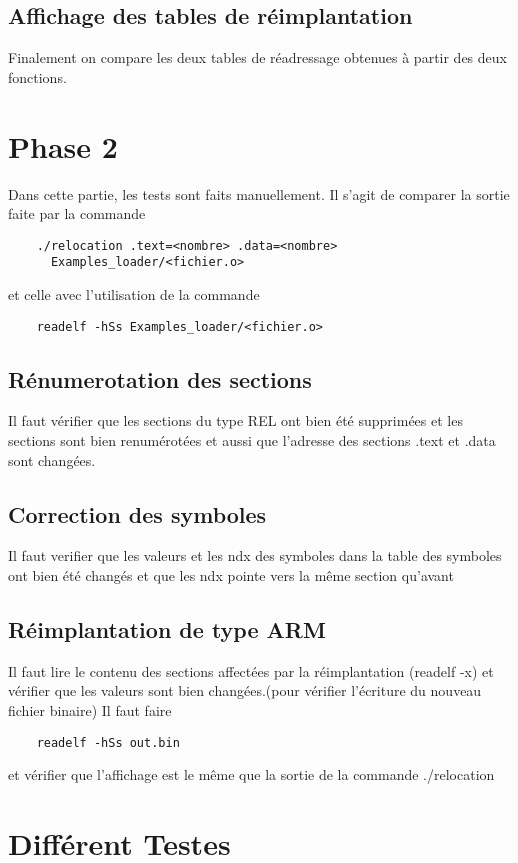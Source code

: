 \documentclass[a4paper]{article} %
\begin{document}
\subsection{Affichage des tables de réimplantation}
Finalement on compare les deux tables de réadressage obtenues à partir des 
deux fonctions.
\section{Phase 2}
Dans cette partie, les tests sont faits manuellement. Il s’agit de comparer 
la sortie faite par la commande 

\begin{lstlisting}
    ./relocation .text=<nombre> .data=<nombre> 
      Examples_loader/<fichier.o>
\end{lstlisting}
et celle avec l’utilisation de la commande 
\begin{lstlisting}
    readelf -hSs Examples_loader/<fichier.o>
\end{lstlisting}


\subsection{Rénumerotation des sections}
Il faut vérifier que les sections du type REL ont bien été supprimées et les 
sections sont bien renumérotées et aussi que l’adresse des sections .text et 
.data sont changées.

\subsection{Correction des symboles}
Il faut verifier que les valeurs et les ndx des symboles dans la table des symboles 
ont bien été changés et que les ndx pointe vers la même section qu’avant

\subsection{Réimplantation de type ARM}
Il faut lire le contenu des sections affectées par la réimplantation (readelf -x) 
et vérifier que les valeurs sont bien changées.(pour vérifier l’écriture du nouveau 
fichier binaire) Il faut faire 
\begin{lstlisting}
    readelf -hSs out.bin 
\end{lstlisting}
et vérifier que l’affichage est le même que la sortie de la commande ./relocation

\section{Différent Testes}
\end{document}
